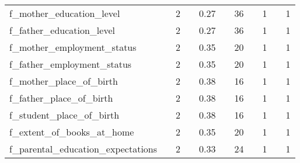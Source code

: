 \begin{table}[htbp]
{\begin{tabular}{l|ll|ll|ll|ll|ll}
f\_mother\_education\_level & \cellcolor{red!0}{$3e-13~(\pm~9e-13)$} & 2  & \cellcolor{red!15}{$0.04~(\pm~0.00)$} & 0.27  & \cellcolor{red!6}{$2.08~~~~~(\pm~0.26)$} & 36  & \cellcolor{red!0}{$0.00~(\pm~0.00)$} & 1 & \cellcolor{red!0}{$0.00~(\pm~0.00)$} & 1 \\
f\_father\_education\_level & \cellcolor{red!0}{$8e-13~(\pm~1e-12)$} & 2  & \cellcolor{red!20}{$0.05~(\pm~0.01)$} & 0.27  & \cellcolor{red!5}{$1.87~~~~~(\pm~0.19)$} & 36  & \cellcolor{red!0}{$0.00~(\pm~0.00)$} & 1 & \cellcolor{red!0}{$0.00~(\pm~0.00)$} & 1 \\
f\_mother\_employment\_status & \cellcolor{red!0}{$2e-12~(\pm~1e-12)$} & 2  & \cellcolor{red!16}{$0.06~(\pm~0.02)$} & 0.35  & \cellcolor{red!1}{$0.21~~~~~(\pm~0.06)$} & 20  & \cellcolor{red!0}{$0.00~(\pm~0.00)$} & 1 & \cellcolor{red!0}{$0.00~(\pm~0.00)$} & 1 \\
f\_father\_employment\_status & \cellcolor{red!0}{$1e-12~(\pm~3e-13)$} & 2  & \cellcolor{red!16}{$0.06~(\pm~0.02)$} & 0.35  & \cellcolor{red!1}{$0.23~~~~~(\pm~0.04)$} & 20  & \cellcolor{red!0}{$0.00~(\pm~0.00)$} & 1 & \cellcolor{red!0}{$0.00~(\pm~0.00)$} & 1 \\
f\_mother\_place\_of\_birth & \cellcolor{red!0}{$3e-14~(\pm~2e-14)$} & 2  & \cellcolor{red!14}{$0.05~(\pm~0.02)$} & 0.38  & \cellcolor{red!1}{$0.15~~~~~(\pm~0.05)$} & 16  & \cellcolor{red!4}{$0.04~(\pm~0.01)$} & 1 & \cellcolor{red!2}{$0.02~(\pm~0.00)$} & 1 \\
f\_father\_place\_of\_birth & \cellcolor{red!0}{$3e-14~(\pm~5e-14)$} & 2  & \cellcolor{red!18}{$0.07~(\pm~0.02)$} & 0.38  & \cellcolor{red!1}{$0.17~~~~~(\pm~0.04)$} & 16  & \cellcolor{red!5}{$0.05~(\pm~0.00)$} & 1 & \cellcolor{red!2}{$0.02~(\pm~0.00)$} & 1 \\
f\_student\_place\_of\_birth & \cellcolor{red!0}{$3e-15~(\pm~5e-14)$} & 2  & \cellcolor{red!11}{$0.04~(\pm~0.00)$} & 0.38  & \cellcolor{red!1}{$0.21~~~~~(\pm~0.13)$} & 16  & \cellcolor{red!5}{$0.05~(\pm~0.01)$} & 1 & \cellcolor{red!2}{$0.02~(\pm~0.00)$} & 1 \\
f\_extent\_of\_books\_at\_home & \cellcolor{red!0}{$2e-12~(\pm~1e-12)$} & 2  & \cellcolor{red!16}{$0.06~(\pm~0.02)$} & 0.35  & \cellcolor{red!4}{$0.71~~~~~(\pm~0.03)$} & 20  & \cellcolor{red!0}{$0.00~(\pm~0.00)$} & 1 & \cellcolor{red!0}{$0.00~(\pm~0.00)$} & 1 \\
f\_parental\_education\_expectations & \cellcolor{red!0}{$7e-15~(\pm~2e-14)$} & 2  & \cellcolor{red!17}{$0.06~(\pm~0.00)$} & 0.33  & \cellcolor{red!3}{$0.61~~~~~(\pm~0.05)$} & 24  & \cellcolor{red!16}{$0.16~(\pm~0.01)$} & 1 & \cellcolor{red!4}{$0.04~(\pm~0.00)$} & 1 \\

\end{tabular}}
\end{table}
